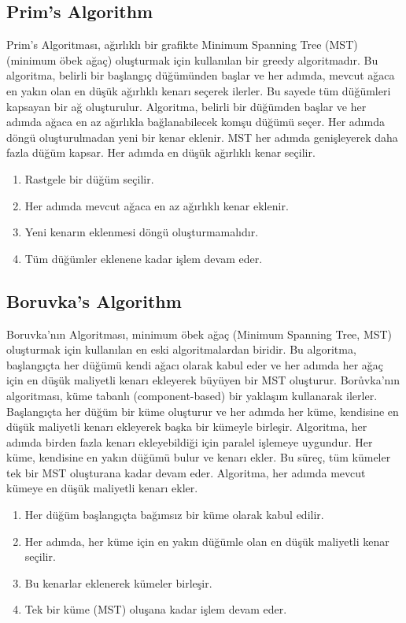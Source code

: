 \newpage

\subsection{Prim's Algorithm}

Prim’s Algoritması, ağırlıklı bir grafikte Minimum Spanning Tree (MST) (minimum öbek ağaç) oluşturmak için kullanılan bir greedy algoritmadır. Bu algoritma, belirli bir başlangıç düğümünden başlar ve her adımda, mevcut ağaca en yakın olan en düşük ağırlıklı kenarı seçerek ilerler. Bu sayede tüm düğümleri kapsayan bir ağ oluşturulur. Algoritma, belirli bir düğümden başlar ve her adımda ağaca en az ağırlıkla bağlanabilecek komşu düğümü seçer. Her adımda döngü oluşturulmadan yeni bir kenar eklenir. MST her adımda genişleyerek daha fazla düğüm kapsar. Her adımda en düşük ağırlıklı kenar seçilir.

\begin{enumerate}
    \item Rastgele bir düğüm seçilir.
    \item Her adımda mevcut ağaca en az ağırlıklı kenar eklenir.
    \item Yeni kenarın eklenmesi döngü oluşturmamalıdır.
    \item Tüm düğümler eklenene kadar işlem devam eder.
\end{enumerate}

\newpage

\subsection{Boruvka's Algorithm}

Boruvka'nın Algoritması, minimum öbek ağaç (Minimum Spanning Tree, MST) oluşturmak için kullanılan en eski algoritmalardan biridir. Bu algoritma, başlangıçta her düğümü kendi ağacı olarak kabul eder ve her adımda her ağaç için en düşük maliyetli kenarı ekleyerek büyüyen bir MST oluşturur. Borůvka'nın algoritması, küme tabanlı (component-based) bir yaklaşım kullanarak ilerler. Başlangıçta her düğüm bir küme oluşturur ve her adımda her küme, kendisine en düşük maliyetli kenarı ekleyerek başka bir kümeyle birleşir. Algoritma, her adımda birden fazla kenarı ekleyebildiği için paralel işlemeye uygundur. Her küme, kendisine en yakın düğümü bulur ve kenarı ekler. Bu süreç, tüm kümeler tek bir MST oluşturana kadar devam eder. Algoritma, her adımda mevcut kümeye en düşük maliyetli kenarı ekler.

\begin{enumerate}
    \item Her düğüm başlangıçta bağımsız bir küme olarak kabul edilir.
    \item Her adımda, her küme için en yakın düğümle olan en düşük maliyetli kenar seçilir.
    \item Bu kenarlar eklenerek kümeler birleşir.
    \item Tek bir küme (MST) oluşana kadar işlem devam eder.
\end{enumerate}

